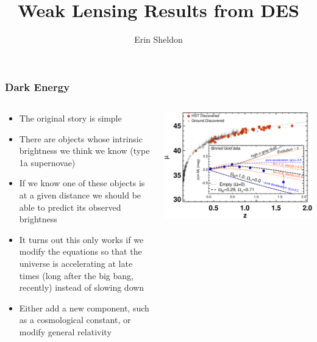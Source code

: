 \documentclass{beamer}
\title{Weak Lensing Results from DES}
\author{Erin Sheldon}
\institute{Brookhaven National Laboratory}
\begin{document}


\frame
{
    \frametitle{Dark Energy}

    \fontsize{9}{0.8\baselineskip}
    \begin{columns}
        \begin{column}{0.5\textwidth}    
            \begin{itemize}
                \item The original story is simple

                \item There are objects whose intrinsic brightness we think we
                    know (type 1a supernovae)

                \item If we know one of these objects is at a given distance we
                    should be able to predict its observed brightness

                \item It turns out this only works if we modify the equations
                    so that the universe is accelerating at late times (long
                    after the big bang, recently) instead of slowing down

                \item Either add a new component, such as a cosmological constant,
                    or modify general relativity

            \end{itemize}
        \end{column}
        \begin{column}{0.5\textwidth}
            \includegraphics[width=\textwidth]{riess-distmodulus.pdf}
        \end{column}
    \end{columns}
}
\end{document}
